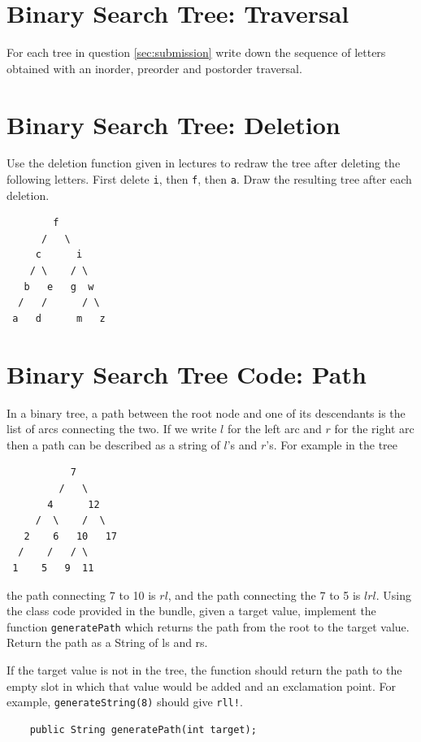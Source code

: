 \documentclass[twoside=false,DIV=14]{scrartcl}
\begin{document}
\section{Binary Search Tree: Traversal}
For each tree in question \ref{sec:submission} write down the sequence of letters obtained with an inorder, preorder and postorder traversal.

\section{Binary Search Tree: Deletion}
Use the deletion function given in lectures to redraw the tree after deleting the following letters.  First delete {\tt i}, then {\tt f}, then {\tt a}.  Draw the resulting tree after each deletion.

\begin{verbatim}
        f
      /   \
     c      i
    / \    / \
   b   e   g  w
  /   /      / \
 a   d      m   z 
\end{verbatim}


\section{Binary Search Tree Code: Path}
In a binary tree, a path between the root node and one of its descendants is the list of arcs connecting the two.  If we write $l$ for the left arc and $r$ for the right arc then a path can be described as a string of $l$'s and $r$'s.  For example in the tree

\begin{verbatim}
           7
         /   \
       4      12
     /  \    /  \
   2    6   10   17
  /    /   / \
 1    5   9  11
\end{verbatim}

the path connecting 7 to 10  is $rl$, and the path connecting the 7 to 5 is $lrl$. Using the class code  provided in the bundle, given a target value, implement the function {\tt generatePath} which returns the path from the root to the target value.  Return the path as a String of ls and rs.

If the target value is not in the tree, the function should return the path to the empty slot in which that value would be added and an exclamation point.  For example, \verb+generateString(8)+ should give \verb+rll!+.

\begin{verbatim}
	public String generatePath(int target);
\end{verbatim}
\end{document}
